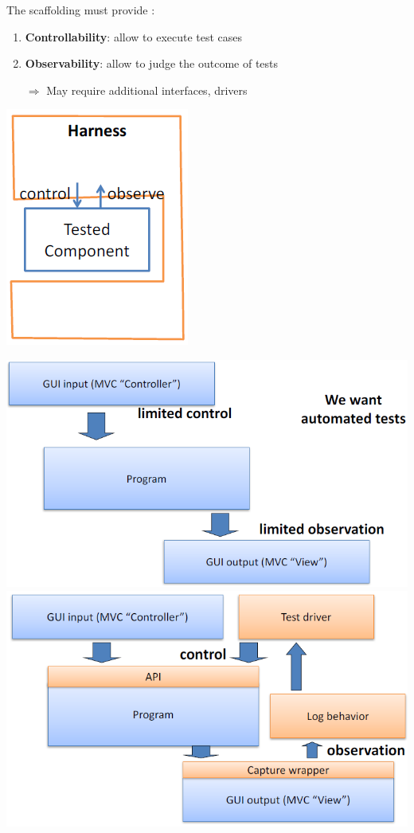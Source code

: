 \documentclass{article}
\begin{document}
\noindent The
scaffolding must
provide : 
\begin{multicols}{2}
\begin{enumerate}
    \item \textbf{Controllability}:
allow to
execute test
cases
    \item \textbf{Observability}:
allow to
judge the
outcome of
tests
    \item [$\Rightarrow$] May
require additional interfaces,
drivers
\end{enumerate}
\vfill\null\columnbreak
\begin{center}
    \includegraphics[scale=0.5]{image/46.PNG}
\end{center}
\end{multicols}
\begin{center}
    \includegraphics[scale=0.35]{image/47.PNG}
    \includegraphics[scale=0.35]{image/48.PNG}
\end{center}
\end{document}
